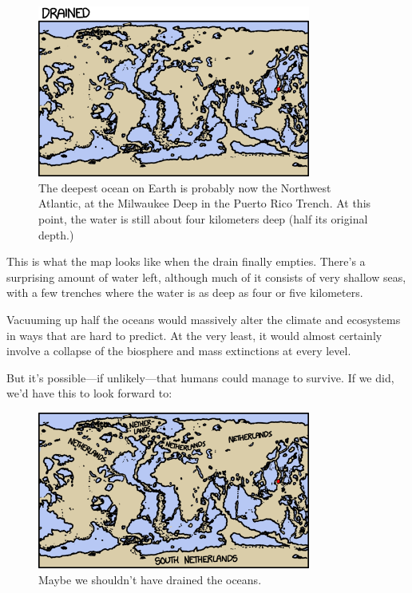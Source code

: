{\begin{figure}[!htbp]
\centering
\includegraphics[scale=0.5, max width=0.8\textwidth]{imgs/a/53/drain_ed.png}
\caption{The deepest ocean on Earth is probably now the Northwest Atlantic, at the Milwaukee Deep in the Puerto Rico Trench. At this point, the water is still about four kilometers deep (half its original depth.)}
\end{figure}

{This is what the map looks like when the drain finally empties. There's a surprising amount of water left, although much of it consists of very shallow seas, with a few trenches where the water is as deep as four or five kilometers.}

{Vacuuming up half the oceans would massively alter the climate and ecosystems in ways that are hard to predict. At the very least, it would almost certainly involve a collapse of the biosphere and mass extinctions at every level.}

{But it's possible—if unlikely—that humans could manage to survive. If we did, we'd have this to look forward to:}

\begin{figure}[!htbp]
\centering
\includegraphics[scale=0.5, max width=0.8\textwidth]{imgs/a/53/drain_nl.png}
\caption{Maybe we shouldn't have drained the oceans.}
\end{figure}

}
